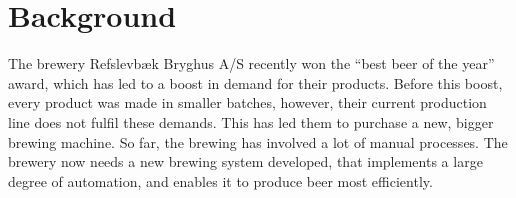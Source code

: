 \section{Background}
The brewery Refslevbæk Bryghus A/S recently won the “best beer of the year” 
award, which has led to a boost in demand for their products. Before this boost,
every product was made in smaller batches, however, their current production
line does not fulfil these demands. This has led them to purchase a new, bigger
brewing machine. So far, the brewing has involved a lot of manual processes.
The brewery now needs a new brewing system developed, that implements a large
degree of automation, and enables it to produce beer most efficiently.